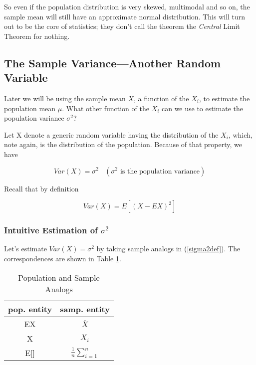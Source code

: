 So even if the population distribution is very skewed, multimodal and so
on, the sample mean will still have an approximate normal distribution.
This will turn out to be the core of statistics; they don't call the
theorem the {\it Central} Limit Theorem for nothing.

\subsection{The Sample Variance---Another Random Variable}

Later we will be using the sample mean $\overline{X}$, a function of the
$X_i$, to estimate the population mean $\mu$.  What other function of the
$X_i$ can we use to estimate the population variance $\sigma^2$?

Let X denote a generic random variable having the distribution of the
$X_i$, which, note again, is the distribution of the population.
Because of that property, we have

\begin{equation}
Var(X) = \sigma^2   ~~~~ (\sigma^2 \textrm{ is the population variance})
\end{equation}

Recall that by definition

\begin{equation}
\label{sigma2def}
Var(X)
= E[(X-EX)^2]
\end{equation}

\subsubsection{Intuitive Estimation of $\sigma^2$}

Let's estimate $Var(X) = \sigma^2$ by taking sample analogs
in (\ref{sigma2def}).  The correspondences are shown in Table
\ref{analogs}.

\begin{table}
\vskip 0.5in
\begin{center}
\begin{tabular}{|c|c|}
\hline
pop. entity & samp. entity \\ \hline 
\hline
EX & $\overline{X}$ \\ \hline 
X & $X_i$ \\ \hline
E[] & $\frac{1}{n} \sum_{i=1}^n$ \\ \hline
\end{tabular}
\caption{Population and Sample Analogs}
\label{analogs}
\end{center}
\end{table}

